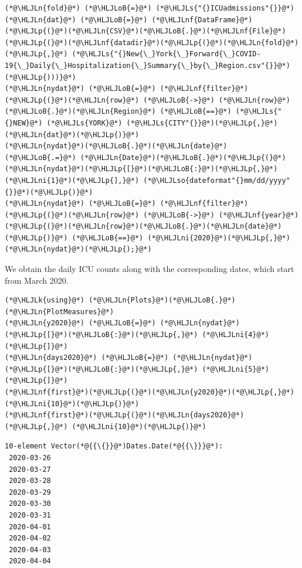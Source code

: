 \documentclass[12pt,a4paper]{article}
\newcommand{\HLJLk}[1]{\textcolor[RGB]{148,91,176}{\textbf{#1}}}
\newcommand{\HLJLn}[1]{#1}
\newcommand{\HLJLnf}[1]{\textcolor[RGB]{66,102,213}{#1}}
\newcommand{\HLJLs}[1]{\textcolor[RGB]{201,61,57}{#1}}
\newcommand{\HLJLso}[1]{\textcolor[RGB]{201,61,57}{#1}}
\newcommand{\HLJLni}[1]{\textcolor[RGB]{59,151,46}{#1}}
\newcommand{\HLJLoB}[1]{\textcolor[RGB]{102,102,102}{\textbf{#1}}}
\newcommand{\HLJLp}[1]{#1}
\begin{document}
\begin{lstlisting}
(*@\HLJLn{fold}@*) (*@\HLJLoB{=}@*) (*@\HLJLs{"{}ICUadmissions"{}}@*)
(*@\HLJLn{dat}@*) (*@\HLJLoB{=}@*) (*@\HLJLnf{DataFrame}@*)(*@\HLJLp{(}@*)(*@\HLJLn{CSV}@*)(*@\HLJLoB{.}@*)(*@\HLJLnf{File}@*)(*@\HLJLp{(}@*)(*@\HLJLnf{datadir}@*)(*@\HLJLp{(}@*)(*@\HLJLn{fold}@*)(*@\HLJLp{,}@*) (*@\HLJLs{"{}New{\_}York{\_}Forward{\_}COVID-19{\_}Daily{\_}Hospitalization{\_}Summary{\_}by{\_}Region.csv"{}}@*)(*@\HLJLp{)))}@*)
(*@\HLJLn{nydat}@*) (*@\HLJLoB{=}@*) (*@\HLJLnf{filter}@*)(*@\HLJLp{(}@*)(*@\HLJLn{row}@*) (*@\HLJLoB{->}@*) (*@\HLJLn{row}@*)(*@\HLJLoB{.}@*)(*@\HLJLn{Region}@*) (*@\HLJLoB{==}@*) (*@\HLJLs{"{}NEW}@*) (*@\HLJLs{YORK}@*) (*@\HLJLs{CITY"{}}@*)(*@\HLJLp{,}@*) (*@\HLJLn{dat}@*)(*@\HLJLp{)}@*)
(*@\HLJLn{nydat}@*)(*@\HLJLoB{.}@*)(*@\HLJLn{date}@*) (*@\HLJLoB{.=}@*) (*@\HLJLn{Date}@*)(*@\HLJLoB{.}@*)(*@\HLJLp{(}@*)(*@\HLJLn{nydat}@*)(*@\HLJLp{[}@*)(*@\HLJLoB{:}@*)(*@\HLJLp{,}@*) (*@\HLJLni{1}@*)(*@\HLJLp{],}@*) (*@\HLJLso{dateformat"{}mm/dd/yyyy"{}}@*)(*@\HLJLp{)}@*)
(*@\HLJLn{nydat}@*) (*@\HLJLoB{=}@*) (*@\HLJLnf{filter}@*)(*@\HLJLp{(}@*)(*@\HLJLn{row}@*) (*@\HLJLoB{->}@*) (*@\HLJLnf{year}@*)(*@\HLJLp{(}@*)(*@\HLJLn{row}@*)(*@\HLJLoB{.}@*)(*@\HLJLn{date}@*)(*@\HLJLp{)}@*) (*@\HLJLoB{==}@*) (*@\HLJLni{2020}@*)(*@\HLJLp{,}@*) (*@\HLJLn{nydat}@*)(*@\HLJLp{);}@*)
\end{lstlisting}


We obtain the daily ICU counts along with the corresponding dates, which start from March 2020.


\begin{lstlisting}
(*@\HLJLk{using}@*) (*@\HLJLn{Plots}@*)(*@\HLJLoB{.}@*)(*@\HLJLn{PlotMeasures}@*)
(*@\HLJLn{y2020}@*) (*@\HLJLoB{=}@*) (*@\HLJLn{nydat}@*)(*@\HLJLp{[}@*)(*@\HLJLoB{:}@*)(*@\HLJLp{,}@*) (*@\HLJLni{4}@*)(*@\HLJLp{]}@*)
(*@\HLJLn{days2020}@*) (*@\HLJLoB{=}@*) (*@\HLJLn{nydat}@*)(*@\HLJLp{[}@*)(*@\HLJLoB{:}@*)(*@\HLJLp{,}@*) (*@\HLJLni{5}@*)(*@\HLJLp{]}@*)
(*@\HLJLnf{first}@*)(*@\HLJLp{(}@*)(*@\HLJLn{y2020}@*)(*@\HLJLp{,}@*) (*@\HLJLni{10}@*)(*@\HLJLp{)}@*)
(*@\HLJLnf{first}@*)(*@\HLJLp{(}@*)(*@\HLJLn{days2020}@*)(*@\HLJLp{,}@*) (*@\HLJLni{10}@*)(*@\HLJLp{)}@*)
\end{lstlisting}

\begin{lstlisting}
10-element Vector(*@{{\{}}@*)Dates.Date(*@{{\}}}@*):
 2020-03-26
 2020-03-27
 2020-03-28
 2020-03-29
 2020-03-30
 2020-03-31
 2020-04-01
 2020-04-02
 2020-04-03
 2020-04-04
\end{lstlisting}
\end{document}
